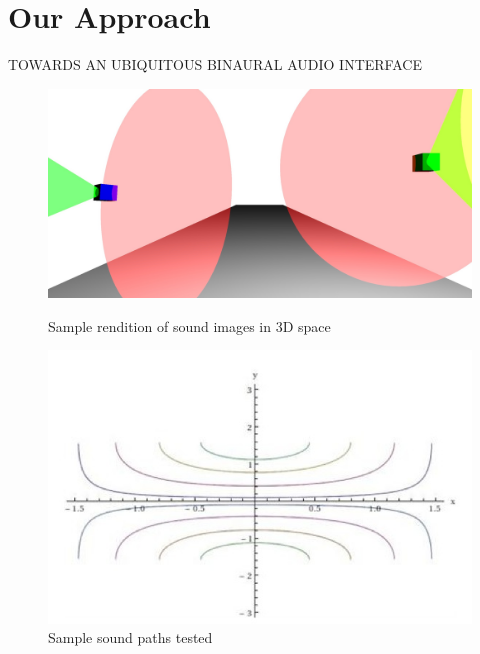 
\newpage                                                 \chapter{Our Approach}

TOWARDS AN UBIQUITOUS BINAURAL AUDIO INTERFACE


\begin{figure}[htbp2]
  \begin{minipage}[b]{.45\linewidth}
    \centering
  \includegraphics[width=1\linewidth]{images/irys_screenshot.jpg}
    \caption{   \small
 Sample rendition of sound images in 3D space}
    \label{fig:irys}
  \end{minipage}
  \hspace{0.5cm}
  \begin{minipage}[b]{0.45\linewidth}
    \centering
  \includegraphics[width=1\linewidth]{images/irys_pathways.jpg}
    \caption{  \small Sample sound paths tested}
    \label{fig:irys_paths}
  \end{minipage}
\end{figure}

